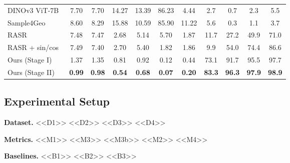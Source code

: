 \begin{table}[!t]
\begin{tabular}{l|cccccc|c|ccc}
        DINOv3 ViT-7B~\citep{simeoni2025dinov3} & 7.70 & 7.70 & 14.27 & 13.39 & 86.23 & 4.44 & 2.7 & 0.7 & 2.3 & 5.5 \\
        Sample4Geo~\citep{deuser2023sample4geo} & 8.60 & 8.29 & 15.88 & 10.59 & 85.90 & 11.22 & 5.6 & 0.3 & 1.1 & 3.7 \\
        RASR~\citep{liang2026rasr} & 7.48 & 7.47 & 2.68 & 5.14 & 5.70 & 1.87 & 11.7 & 27.2 & 49.9 & 71.0 \\
        RASR + sin/cos & 7.49 & 7.40 & 2.70 & 5.40 & 1.82 & 1.86 & 9.9 & 54.0 & 74.4 & 86.6 \\
        \midrule
        Ours (Stage I)  & 1.37 & 1.35 & 0.81 & 0.92 & 0.12 & 0.44 & 73.1 & 91.7 & 95.5 & 97.7 \\
        Ours (Stage II) & \textbf{0.99} & \textbf{0.98} & \textbf{0.54} & \textbf{0.68} & \textbf{0.07} & \textbf{0.20} & \textbf{83.3} & \textbf{96.3} & \textbf{97.9} & \textbf{98.9} \\
        \bottomrule
    \end{tabular}
\end{table}

\subsection{Experimental Setup}
\label{sec:setup}

\noindent \textbf{Dataset.} <<D1>> <<D2>> <<D3>> <<D4>>

\noindent \textbf{Metrics.} <<M1>> <<M3>> <<M3b>> <<M2>> <<M4>>

\noindent \textbf{Baselines.} <<B1>> <<B2>> <<B3>>

